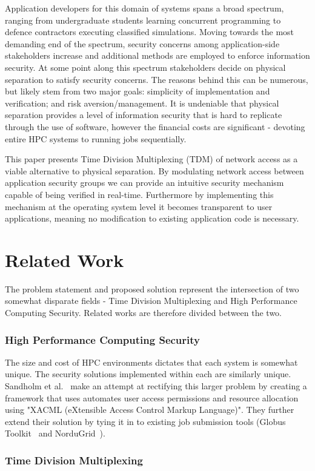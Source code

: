 \documentclass[oneside,12pt]{memoir}
\begin{document}
Application developers for this domain of systems spans a broad spectrum, ranging from undergraduate students learning concurrent programming to defence contractors executing classified simulations. Moving towards the most demanding end of the spectrum, security concerns among application-side stakeholders increase and additional methods are employed to enforce information security. At some point along this spectrum stakeholders decide on physical separation to satisfy security concerns. The reasons behind this can be numerous, but likely stem from two major goals: simplicity of implementation and verification; and risk aversion/management. It is undeniable that physical separation provides a level of information security that is hard to replicate through the use of software, however the financial costs are significant - devoting entire HPC systems to running jobs sequentially. 


This paper presents Time Division Multiplexing (TDM) of network access as a viable alternative to physical separation. By modulating network access between application security groups we can provide an intuitive security mechanism capable of being verified in real-time. Furthermore by implementing this mechanism at the operating system level it becomes transparent to user applications, meaning no modification to existing application code is necessary. 
\chapter{Related Work}
The problem statement and proposed solution represent the intersection of two somewhat disparate fields - Time Division Multiplexing and High Performance Computing Security. Related works are therefore divided between the two. 
\subsection{High Performance Computing Security}
The size and cost of HPC environments dictates that each system is somewhat unique. The security solutions implemented within each are similarly unique. Sandholm et al.~\cite{sandholm2004ogsa} make an attempt at rectifying this larger problem by creating a framework that uses automates user access permissions and resource allocation using "XACML (eXtensible Access Control Markup Language)". They further extend their solution by tying it in to existing job submission tools (Globus Toolkit~\cite{globus_toolkit} and NorduGrid~\cite{nordugrid}). 
\subsection{Time Division Multiplexing}
\end{document}

